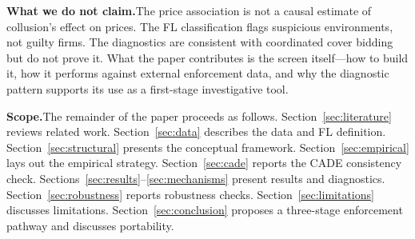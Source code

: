 \medskip
\noindent\textbf{What we do not claim.}\quad The price association is
not a causal estimate of collusion's effect on prices. The FL
classification flags suspicious environments, not guilty firms. The
diagnostics are consistent with coordinated cover bidding but do not
prove it. What the paper contributes is the screen itself---how to
build it, how it performs against external enforcement data, and why
the diagnostic pattern supports its use as a first-stage
investigative tool.

\medskip
\noindent\textbf{Scope.}\quad The remainder of the paper proceeds
as follows. Section~\ref{sec:literature} reviews related work.
Section~\ref{sec:data} describes the data and FL definition.
Section~\ref{sec:structural} presents the conceptual framework.
Section~\ref{sec:empirical} lays out the empirical strategy.
Section~\ref{sec:cade} reports the CADE consistency check.
Sections~\ref{sec:results}--\ref{sec:mechanisms} present results and
diagnostics. Section~\ref{sec:robustness} reports robustness checks.
Section~\ref{sec:limitations} discusses limitations.
Section~\ref{sec:conclusion} proposes a three-stage enforcement
pathway and discusses portability.
